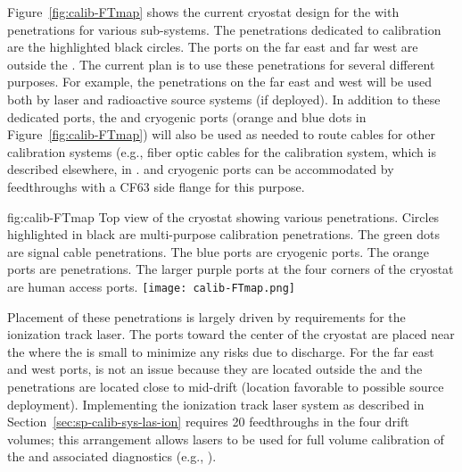 
Figure~\ref{fig:calib-FTmap} shows the current cryostat design for the %
\spmod with penetrations for various sub-systems. The penetrations dedicated to calibration are the highlighted black circles. The ports on the far east and far west are outside the . The current plan is to use these penetrations for several different purposes. For example, the penetrations on the far east and west will be used both by laser and radioactive source systems (if deployed). In addition to these dedicated ports, the  and cryogenic ports (orange and blue dots in Figure~\ref{fig:calib-FTmap}) will also be used as needed to route cables for other calibration systems (e.g., fiber optic cables for the   calibration system, which is described elsewhere, in  \spchpds.  and cryogenic ports can be accommodated by feedthroughs with a CF63 side flange for this purpose.   

\begin{dunefigure}{fig:calib-FTmap}
{Top view of the \spmod %
cryostat showing various penetrations. Circles highlighted in black are multi-purpose calibration penetrations. The green dots are  signal cable penetrations. The blue ports are cryogenic ports. The orange ports are  penetrations. The larger purple ports at the four corners of the cryostat are human access ports.}
\texttt{[image: calib-FTmap.png]}
\end{dunefigure}





Placement of these penetrations is largely driven by requirements for the ionization track laser. %
The ports %
toward the center of the cryostat are placed near the  where the \efield is small %
to minimize any risks due to %
 discharge. For the far east and west ports,  is not an issue because they are located outside the  and the penetrations are located %
close to mid-drift (location favorable to possible source deployment).
Implementing the ionization track laser system as %
described in Section~\ref{sec:sp-calib-sys-las-ion} requires \num{20} feedthroughs %
in the four  drift volumes; this arrangement allows lasers to be used for full volume calibration of the \efield and associated diagnostics (e.g., ). 

